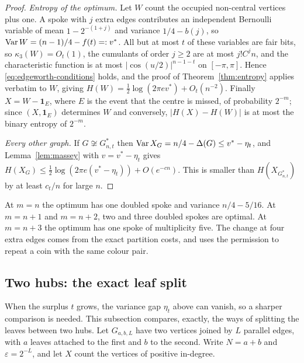 \documentclass[11pt,a4paper]{article}
\theoremstyle{definition}\newtheorem{remark}[theorem]{Remark}\newtheorem{conjecture}{Conjecture}
\newcommand{\ind}{\mathbf 1}\newcommand{\eps}{\varepsilon}\newcommand{\dist}{d_{\rm TV}}
\begin{document}
\begin{proof}
\emph{Entropy of the optimum.} Let $W$ count the occupied non-central vertices plus one. A spoke with $j$ extra edges contributes an independent Bernoulli variable of mean $1-2^{-(1+j)}$ and variance $1/4-b(j)$, so $\operatorname{Var} W=(n-1)/4-f(t)=:v^*$. All but at most $t$ of these variables are fair bits, so $\kappa_3(W)=O_t(1)$, the cumulants of order $j\ge2$ are at most $j!C^jn$, and the characteristic function is at most $|\cos(u/2)|^{n-1-t}$ on $[-\pi,\pi]$. Hence \eqref{eq:edgeworth-conditions} holds, and the proof of Theorem~\ref{thm:entropy} applies verbatim to $W$, giving $H(W)=\tfrac12\log(2\pi ev^*)+O_t(n^{-2})$. Finally $X=W-\ind_E$, where $E$ is the event that the centre is missed, of probability $2^{-m}$; since $(X,\ind_E)$ determines $W$ and conversely, $|H(X)-H(W)|$ is at most the binary entropy of $2^{-m}$.

\emph{Every other graph.} If $G\not\cong G^*_{n,t}$ then $\operatorname{Var} X_G=n/4-\Delta(G)\le v^*-\eta_t$, and Lemma~\ref{lem:massey} with $v=v^*-\eta_t$ gives $H(X_G)\le\tfrac12\log(2\pi e(v^*-\eta_t))+O(e^{-cn})$. This is smaller than $H(X_{G^*_{n,t}})$ by at least $c_t/n$ for large $n$.
\end{proof}

At $m=n$ the optimum has one doubled spoke and variance $n/4-5/16$. At $m=n+1$ and $m=n+2$, two and three doubled spokes are optimal. At $m=n+3$ the optimum has one spoke of multiplicity five. The change at four extra edges comes from the exact partition costs, and uses the permission to repeat a coin with the same colour pair.

\subsection{Two hubs: the exact leaf split}\label{sec:twohubs}
When the surplus $t$ grows, the variance gap $\eta_t$ above can vanish, so a sharper comparison is needed. This subsection compares, exactly, the ways of splitting the leaves between two hubs. Let $G_{a,b,L}$ have two vertices joined by $L$ parallel edges, with $a$ leaves attached to the first and $b$ to the second. Write $N=a+b$ and $\eps=2^{-L}$, and let $X$ count the vertices of positive in-degree.
\end{document}
